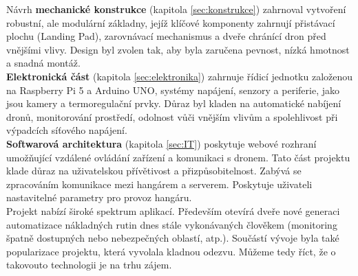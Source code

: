 \documentclass[a4paper]{article}
\begin{document}
    \noindent
    Návrh \textbf{mechanické konstrukce} (kapitola \ref{sec:konstrukce}) zahrnoval vytvoření robustní, ale modulární základny, jejíž klíčové komponenty zahrnují přistávací plochu (Landing Pad), zarovnávací mechanismus a dveře chránící dron před vnějšími vlivy. Design byl zvolen tak, aby byla zaručena pevnost, nízká hmotnost a snadná montáž.\\

    \noindent
    \textbf{Elektronická část} (kapitola \ref{sec:elektronika}) zahrnuje řídicí jednotku založenou na Raspberry Pi 5 a Arduino UNO, systémy napájení, senzory a periferie, jako jsou kamery a termoregulační prvky. Důraz byl kladen na automatické nabíjení dronů, monitorování prostředí, odolnost vůči vnějším vlivům a spolehlivost při výpadcích síťového napájení.\\

    \noindent
    \textbf{Softwarová architektura} (kapitola \ref{sec:IT}) poskytuje webové rozhraní umožňující vzdálené ovládání zařízení a komunikaci s dronem. Tato část projektu klade důraz na uživatelskou přívětivost a přizpůsobitelnost. Zabývá se zpracováním komunikace mezi hangárem a serverem. Poskytuje uživateli nastavitelné parametry pro provoz hangáru.\\

    \noindent
    Projekt nabízí široké spektrum aplikací. Především otevírá dveře nové generaci automatizace nákladných rutin dnes stále vykonávaných člověkem (monitoring špatně dostupných nebo nebezpečných oblastí, atp.). Součástí vývoje byla také popularizace projektu, která vyvolala kladnou odezvu. Můžeme tedy říct, že o takovouto technologii je na trhu zájem.
\newpage
\listoffigures

 \label{dwg:1}
 \label{dwg:2}
 \label{dwg:3}
 \label{dwg:4}
 \label{dwg:5}
 \label{dwg:6}
 \label{dwg:7}
 \label{dwg:8}
\end{document}
